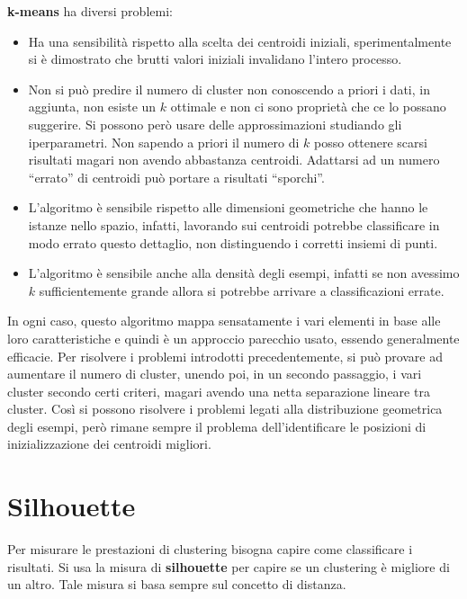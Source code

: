 \textbf{k-means} ha diversi problemi:
\begin{itemize}
      \item Ha una sensibilità rispetto alla scelta dei centroidi iniziali,
            sperimentalmente si è dimostrato che brutti valori iniziali
            invalidano l'intero processo.
      \item Non si può predire il numero di cluster non conoscendo a priori i
            dati, in aggiunta, non esiste un $k$ ottimale e non ci sono proprietà
            che ce lo possano suggerire. Si possono però usare delle
            approssimazioni studiando gli iperparametri. Non sapendo a priori il
            numero di $k$ posso ottenere scarsi risultati magari non avendo
            abbastanza centroidi. Adattarsi ad un numero “errato” di centroidi
            può portare a risultati “sporchi”.
      \item L'algoritmo è sensibile rispetto alle dimensioni geometriche che
            hanno le istanze nello spazio, infatti, lavorando sui centroidi
            potrebbe classificare in modo errato questo dettaglio, non
            distinguendo i corretti insiemi di punti.
      \item L'algoritmo è sensibile anche alla densità degli esempi, infatti se
            non avessimo $k$ sufficientemente grande allora si potrebbe arrivare
            a classificazioni errate.
\end{itemize}
In ogni caso, questo algoritmo mappa sensatamente i vari elementi in base alle
loro caratteristiche e quindi è un approccio parecchio usato, essendo generalmente
efficacie. Per risolvere i problemi introdotti precedentemente, si può provare
ad aumentare il numero di cluster, unendo poi, in un secondo passaggio, i vari
cluster secondo certi criteri, magari avendo una netta separazione lineare tra
cluster. Così si possono risolvere i problemi legati alla distribuzione geometrica
degli esempi, però rimane sempre il problema dell'identificare le posizioni di
inizializzazione dei centroidi migliori.
\section{Silhouette}
Per misurare le prestazioni di clustering bisogna capire come classificare i
risultati. Si usa la misura di \textbf{silhouette} per capire se un clustering è
migliore di un altro. Tale misura si basa sempre sul concetto di distanza.

